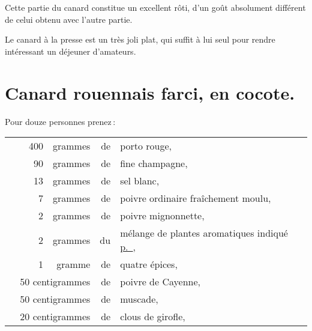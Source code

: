 Cette partie du canard constitue un excellent rôti, d'un goût absolument
différent de celui obtenu avec l'autre partie.

Le canard à la presse est un très joli plat, qui suffit à lui seul pour rendre
intéressant un déjeuner d'amateurs.

\section*{\centering Canard rouennais farci, en cocote.}
{}

Pour douze personnes prenez :

\footnotesize
\begin{longtable}{rrrrrp{18em}}
  & \hspace{2em} & 400 & grammes & de & porto rouge,                                                      \\
  & \hspace{2em} &  90 & grammes & de & fine champagne,                                                   \\
  & \hspace{2em} &  13 & grammes & de & sel blanc,                                                        \\
  & \hspace{2em} &   7 & grammes & de & poivre ordinaire fraîchement moulu,                               \\
  & \hspace{2em} &   2 & grammes & de & poivre mignonnette,                                               \\
  & \hspace{2em} &   2 & grammes & du & mélange de plantes aromatiques indiqué \hyperlink{p0584}{p. \pageref{pg0584}}, \\
  & \hspace{2em} &   1 & gramme  & de & quatre épices,                                                    \\
  & \multicolumn{3}{r}{50 centigrammes} & de & poivre de Cayenne,                                         \\
  & \multicolumn{3}{r}{50 centigrammes} & de & muscade,                                                   \\
  & \multicolumn{3}{r}{20 centigrammes} & de & clous de girofle,                                          \\

\end{longtable}
